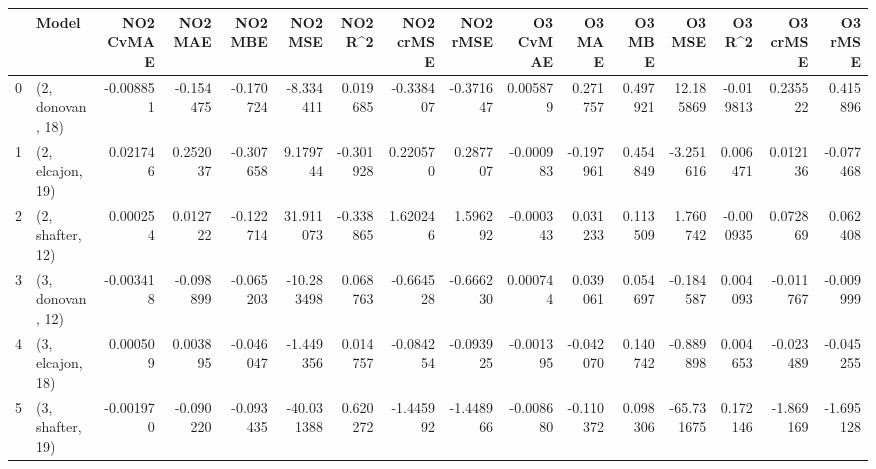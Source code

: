 \begin{tabular}{llrrrrrrrrrrrrrr}
\toprule
{} &             Model &  NO2 CvMAE &   NO2 MAE &   NO2 MBE &    NO2 MSE &   NO2 R\textasciicircum2 &  NO2 crMSE &  NO2 rMSE &  O3 CvMAE &    O3 MAE &    O3 MBE &     O3 MSE &    O3 R\textasciicircum2 &  O3 crMSE &   O3 rMSE \\
\midrule
0 &  (2, donovan, 18) &  -0.008851 & -0.154475 & -0.170724 &  -8.334411 &  0.019685 &  -0.338407 & -0.371647 &  0.005879 &  0.271757 &  0.497921 &  12.185869 & -0.019813 &  0.235522 &  0.415896 \\
1 &  (2, elcajon, 19) &   0.021746 &  0.252037 & -0.307658 &   9.179744 & -0.301928 &   0.220570 &  0.287707 & -0.000983 & -0.197961 &  0.454849 &  -3.251616 &  0.006471 &  0.012136 & -0.077468 \\
2 &  (2, shafter, 12) &   0.000254 &  0.012722 & -0.122714 &  31.911073 & -0.338865 &   1.620246 &  1.596292 & -0.000343 &  0.031233 &  0.113509 &   1.760742 & -0.000935 &  0.072869 &  0.062408 \\
3 &  (3, donovan, 12) &  -0.003418 & -0.098899 & -0.065203 & -10.283498 &  0.068763 &  -0.664528 & -0.666230 &  0.000744 &  0.039061 &  0.054697 &  -0.184587 &  0.004093 & -0.011767 & -0.009999 \\
4 &  (3, elcajon, 18) &   0.000509 &  0.003895 & -0.046047 &  -1.449356 &  0.014757 &  -0.084254 & -0.093925 & -0.001395 & -0.042070 &  0.140742 &  -0.889898 &  0.004653 & -0.023489 & -0.045255 \\
5 &  (3, shafter, 19) &  -0.001970 & -0.090220 & -0.093435 & -40.031388 &  0.620272 &  -1.445992 & -1.448966 & -0.008680 & -0.110372 &  0.098306 & -65.731675 &  0.172146 & -1.869169 & -1.695128 \\
\bottomrule
\end{tabular}
